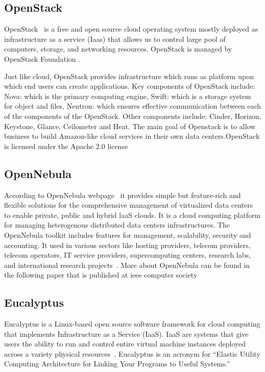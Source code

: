 \subsection{OpenStack \cv}
 
OpenStack~\cite{www-OpenStack.org} is a free and open source cloud
operating system mostly deployed as infrastructure as a service (Iaas)
that allows us to control large pool of computers, storage, and
networking resources.  OpenStack is managed by OpenStack Foundation
\cite{www-OpenStack-Found}.
     
Just like cloud, OpenStack provides infrastructure which runs as
platform upon which end users can create applications. Key components
of OpenStack include: Nova: which is the primary computing engine,
Swift: which is a storage system for object and files, Neutron: which
ensures effective communication between each of the components of the
OpenStack. Other components include: Cinder, Horizon, Keystone,
Glance, Ceilometer and Heat. The main goal of Openstack is to allow
business to build Amazon-like cloud services in their own data
centers.OpenStack is licensed under the Apache 2.0 license
\cite{www-apache-license}
	
\subsection{OpenNebula \cv}

According to OpenNebula webpage~\cite{www-opennebula-org} it provides
simple but feature-rich and flexible solutions for the comprehensive
management of virtualized data centers to enable private, public and
hybrid laaS clouds. It is a cloud computing platform for managing
heterogenous distributed data centers infrastructures. The OpenNebula
toolkit includes features for management, scalability, security and
accounting. It used in various sectors like hosting providers, telecom
providers, telecom operators, IT service providers, supercomputing
centers, research labs, and international research
projects~\cite{www-opennebula-wiki}. More about OpenNebula can be
found in the following paper that is published at ieee computer
society~\cite{paper-opennebula}
     
\subsection{Eucalyptus}

Eucalyptus is a Linux-based open source software framework for cloud
computing that implements Infrastructure as a Service (IaaS). IaaS are
systems that give users the ability to run and control entire virtual
machine instances deployed across a variety physical
resources~\cite{paper-eucalyptus}. Eucalyptus is an acronym for
``Elastic Utility Computing Architecture for Linking Your Programs to
Useful Systems.''

